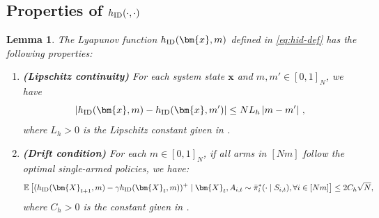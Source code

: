 \documentclass{article}
\theoremstyle{plain}
\newtheorem{lemma}{Lemma}
\theoremstyle{remark}
\newcommand{\abs}[1]{\left\lvert#1\right\rvert}
\newcommand{\mx}{\bm{x}}
\newcommand{\hid}{h_{\textnormal{ID}}}
\newcommand{\ID}{\textnormal{ID}}
\def\mX{{\bm{X}}}
\newcommand{\EE}{\mathbb{E}}
\newcommand{\mbracket}[1]{\left[#1\right]}
\begin{document}
\subsection{Properties of $h_{\ID}(\cdot,\cdot)$}
\label{sec:properties-hID}

\begin{lemma}\label{lem:hID drift}
The Lyapunov function $\hid(\mx, m)$ defined in \eqref{eq:hid-def} has the following properties: 
\begin{enumerate}
    \item \textbf{(Lipschitz continuity)} For each system state $\mx$ and $m, m'\in[0,1]_N$, we have
    \begin{equation}
        \label{eq:hid-drift-condition}
        \abs{h_{\ID}(\mx,m)-h_{\ID}(\mx,m')}\leq NL_h\abs{m-m'}\,,
    \end{equation}
    where $L_h > 0$ is the Lipschitz constant given in . 
    \item \textbf{(Drift condition)} 
        For each $m\in[0,1]_N$, if all arms in $[Nm]$ follow the optimal single-armed policies, we have: 
        \begin{align*}
            \EE\mbracket{(h_{\ID}(\mX_{t+1},m)-\gamma h_{\ID}(\mX_t,m))^+\mid\mX_t, A_{i,t}\sim\Bar{\pi}_i^*(\cdot\mid S_{i,t}),\forall i \in [Nm]}\leq 2C_h\sqrt{N},
        \end{align*}
        where $C_h > 0$ is the constant given in .  
\end{enumerate}
\end{lemma}
\end{document}
